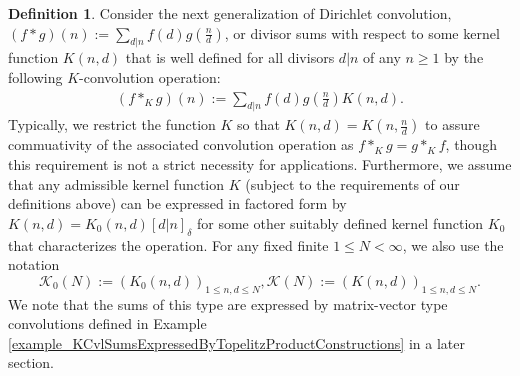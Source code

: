 \documentclass[12pt,reqno,a4letter]{article}
\numberwithin{figure}{section}
\numberwithin{table}{section}
\numberwithin{equation}{section}
\newcommand{\Iverson}[1]{\ensuremath{\left[#1\right]_{\delta}}}
\theoremstyle{plain}
\numberwithin{theorem}{section}
\theoremstyle{definition}
\newtheorem{definition}[theorem]{Definition}
\begin{document}
\begin{definition}
\label{def_KCvlSumsDefs} 
Consider the next generalization of Dirichlet convolution, 
$(f \ast g)(n) := \sum_{d|n} f(d) g\left(\frac{n}{d}\right)$, 
or divisor sums with respect to some kernel function $K(n,d)$ that is well defined for all 
divisors $d|n$ of any $n \geq 1$ by the following $K$-convolution operation: 
\begin{align}
\label{eqn_KCvl_fg_def_v1}
(f \ast_K g)(n) := \sum_{d|n} f(d) g\left(\frac{n}{d}\right) K(n, d). 
\end{align}
Typically, we restrict the function $K$ so that 
$K(n, d) = K\left(n, \frac{n}{d}\right)$ to assure commuativity of 
the associated convolution operation as $f \ast_K g = g \ast_K f$, though this requirement is 
not a strict necessity for applications. 
Furthermore, we assume that any admissible kernel function $K$ (subject to the requirements of 
our definitions above) can be expressed in factored form by $K(n, d) = K_0(n,d) \Iverson{d|n}$ 
for some other suitably defined kernel function $K_0$ that characterizes the operation. 
For any fixed finite $1 \leq N < \infty$, we also use the notation 
\[
\mathcal{K}_0(N) := (K_0(n,d))_{1 \leq n,d \leq N}, \mathcal{K}(N) := (K(n,d))_{1 \leq n,d \leq N}. 
\]
We note that the sums of this type are expressed by matrix-vector type convolutions defined in 
Example \ref{example_KCvlSumsExpressedByTopelitzProductConstructions} in a later section.
\end{definition} 
\end{document}

